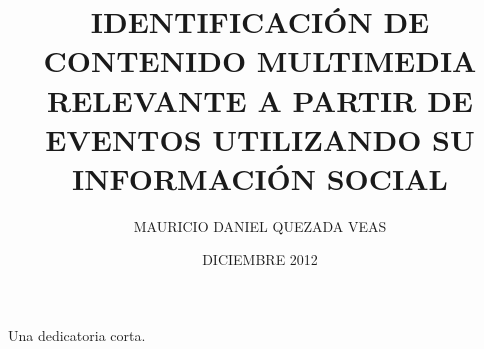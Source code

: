 \documentclass[upright, contnum]{umemoria}
\author{MAURICIO DANIEL QUEZADA VEAS}
\title{IDENTIFICACI\'ON DE CONTENIDO MULTIMEDIA RELEVANTE A PARTIR DE EVENTOS UTILIZANDO SU INFORMACI\'ON SOCIAL}
\date{DICIEMBRE 2012}
\begin{document}
\frontmatter
\maketitle

\begin{abstract}
\lipsum[1-4]
\end{abstract}

\begin{dedicatoria}
Una dedicatoria corta.
\end{dedicatoria}

\begin{thanks}
\lipsum[1-2]
\end{thanks}

\cleardoublepage
\tableofcontents
\cleardoublepage
\listoftables
\cleardoublepage
\listoffigures

\mainmatter








\nocite{*}


\end{document}
